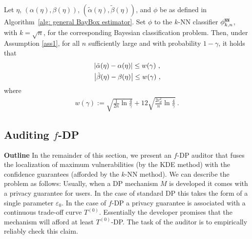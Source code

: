 \begin{theo}%
    \label{thm: accuracy stat of kNN BayBox estimator}
    Let $\eta$, $(\alpha(\eta), \beta(\eta))$, $(\tilde{\alpha}(\eta), \tilde{\beta}(\eta))$, and $\phi$ be as defined in Algorithm~\ref{alg: general BayBox estimator}. Set $\phi$ to the $k$-NN classifier $\phi^{\mathtt{NN}}_{k, n}$, with $k = \sqrt{n}$, for the corresponding Bayesian classification problem.
    Then, under Assumption \ref{ass1}, for all $n$ sufficiently large and with probability $1 - \gamma$, it holds that
    \begin{align*}
    &\left| {\tilde{\alpha}(\eta) - \alpha(\eta)} \right|\leq w(\gamma)~,\\& \left| {\tilde{\beta}(\eta) - \beta(\eta)} \right| \leq w(\gamma)~,
    \end{align*}
    where
    \begin{align}
    w(\gamma):=\sqrt{\frac{1}{2n}\ln{\frac{4}{\gamma}}} + 12\sqrt{\frac{2c_d^2}{n}\ln{\frac{4}{\gamma}}}~. \label{e:wgamma}
    \end{align}
\end{theo}


\subsection{Auditing $f$-DP} \label{sec:audit}

\textbf{Outline} In the remainder of this section, we present an $f$-DP auditor that fuses the localization of maximum vulnerabilities (by the KDE method) with the confidence guarantees (afforded by the $k$-NN method). We can describe the problem as follows: Usually, when a DP mechanism $M$ is developed it comes with a privacy guarantee for users. In the case of standard DP this takes the form of a single parameter $\varepsilon_0$. In the case of $f$-DP a privacy guarantee is associated with a continuous trade-off curve $T^{(0)}$. Essentially the developer promises that the mechanism will afford at least $T^{(0)}$-DP. The task of the auditor is to empirically reliably check this claim.

